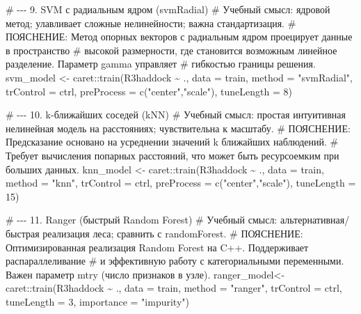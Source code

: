 \documentclass[
  letterpaper,
  DIV=11,
  numbers=noendperiod]{scrreprt}
\newenvironment{Shaded}{\begin{snugshade}}{\end{snugshade}}
\newcommand{\AttributeTok}[1]{\textcolor[rgb]{0.40,0.45,0.13}{#1}}
\newcommand{\CommentTok}[1]{\textcolor[rgb]{0.37,0.37,0.37}{#1}}
\newcommand{\DecValTok}[1]{\textcolor[rgb]{0.68,0.00,0.00}{#1}}
\newcommand{\FunctionTok}[1]{\textcolor[rgb]{0.28,0.35,0.67}{#1}}
\newcommand{\NormalTok}[1]{\textcolor[rgb]{0.00,0.23,0.31}{#1}}
\newcommand{\OtherTok}[1]{\textcolor[rgb]{0.00,0.23,0.31}{#1}}
\newcommand{\SpecialCharTok}[1]{\textcolor[rgb]{0.37,0.37,0.37}{#1}}
\newcommand{\StringTok}[1]{\textcolor[rgb]{0.13,0.47,0.30}{#1}}
\begin{document}
\begin{Shaded}
\begin{Highlighting}[]
\CommentTok{\# {-}{-}{-} 9. SVM с радиальным ядром (svmRadial)}
\CommentTok{\# Учебный смысл: ядровой метод; улавливает сложные нелинейности; важна стандартизация.}
\CommentTok{\# ПОЯСНЕНИЕ: Метод опорных векторов с радиальным ядром проецирует данные в пространство }
\CommentTok{\# высокой размерности, где становится возможным линейное разделение. Параметр gamma управляет }
\CommentTok{\# гибкостью границы решения.}
\NormalTok{svm\_model   }\OtherTok{\textless{}{-}}\NormalTok{ caret}\SpecialCharTok{::}\FunctionTok{train}\NormalTok{(R3haddock }\SpecialCharTok{\textasciitilde{}}\NormalTok{ ., }\AttributeTok{data =}\NormalTok{ train, }\AttributeTok{method =} \StringTok{"svmRadial"}\NormalTok{,}
                            \AttributeTok{trControl =}\NormalTok{ ctrl, }\AttributeTok{preProcess =} \FunctionTok{c}\NormalTok{(}\StringTok{"center"}\NormalTok{,}\StringTok{"scale"}\NormalTok{), }\AttributeTok{tuneLength =} \DecValTok{8}\NormalTok{)}

\CommentTok{\# {-}{-}{-} 10. k{-}ближайших соседей (kNN)}
\CommentTok{\# Учебный смысл: простая интуитивная нелинейная модель на расстояниях; чувствительна к масштабу.}
\CommentTok{\# ПОЯСНЕНИЕ: Предсказание основано на усреднении значений k ближайших наблюдений. }
\CommentTok{\# Требует вычисления попарных расстояний, что может быть ресурсоемким при больших данных.}
\NormalTok{knn\_model   }\OtherTok{\textless{}{-}}\NormalTok{ caret}\SpecialCharTok{::}\FunctionTok{train}\NormalTok{(R3haddock }\SpecialCharTok{\textasciitilde{}}\NormalTok{ ., }\AttributeTok{data =}\NormalTok{ train, }\AttributeTok{method =} \StringTok{"knn"}\NormalTok{,}
                            \AttributeTok{trControl =}\NormalTok{ ctrl, }\AttributeTok{preProcess =} \FunctionTok{c}\NormalTok{(}\StringTok{"center"}\NormalTok{,}\StringTok{"scale"}\NormalTok{), }\AttributeTok{tuneLength =} \DecValTok{15}\NormalTok{)}

\CommentTok{\# {-}{-}{-} 11. Ranger (быстрый Random Forest)}
\CommentTok{\# Учебный смысл: альтернативная/быстрая реализация леса; сравнить с randomForest.}
\CommentTok{\# ПОЯСНЕНИЕ: Оптимизированная реализация Random Forest на C++. Поддерживает распараллеливание }
\CommentTok{\# и эффективную работу с категориальными переменными. Важен параметр mtry (число признаков в узле).}
\NormalTok{ranger\_model}\OtherTok{\textless{}{-}}\NormalTok{ caret}\SpecialCharTok{::}\FunctionTok{train}\NormalTok{(R3haddock }\SpecialCharTok{\textasciitilde{}}\NormalTok{ ., }\AttributeTok{data =}\NormalTok{ train, }\AttributeTok{method =} \StringTok{"ranger"}\NormalTok{,}
                            \AttributeTok{trControl =}\NormalTok{ ctrl, }\AttributeTok{tuneLength =} \DecValTok{3}\NormalTok{, }\AttributeTok{importance =} \StringTok{"impurity"}\NormalTok{)}


\end{Highlighting}
\end{Shaded}
\end{document}
